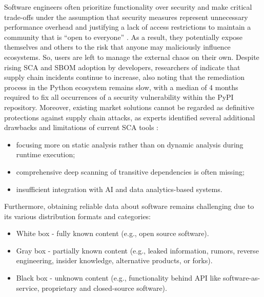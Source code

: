 Software engineers often prioritize functionality over security and make critical trade-offs under the assumption that security measures represent unnecessary performance overhead and justifying a lack of access restrictions to maintain a community that is “open to everyone” \cite{sasse2016debunking}. As a result, they potentially expose themselves and others to the risk that anyone may maliciously influence ecosystems. So, users are left to manage the external chaos on their own. Despite rising SCA and SBOM adoption by developers, researchers of \cite{alfadel2021empirical} indicate that supply chain incidents continue to increase, also noting that the remediation process in the Python ecosystem remains slow, with a median of 4 months required to fix all occurrences of a security vulnerability within the PyPI repository. Moreover, existing market solutions cannot be regarded as definitive protections against supply chain attacks, as experts identified several additional drawbacks and limitations of current SCA tools \cite{dietrich2023security,enck2022top,bohme2025software}:
\begin{itemize}
    \item focusing more on static analysis rather than on dynamic analysis during runtime execution;
    \item comprehensive deep scanning of transitive dependencies is often missing;
    \item insufficient integration with AI and data analytics-based systems.
\end{itemize}

Furthermore, obtaining reliable data about software remains challenging due to its various distribution formats and categories:
\begin{itemize}
    \item White box - fully known content (e.g., open source software).
    \item Gray box - partially known content (e.g., leaked information, rumors, reverse engineering, insider knowledge, alternative products, or forks).
    \item Black box - unknown content (e.g., functionality behind API like software-as-service, proprietary and closed-source software).
\end{itemize}

